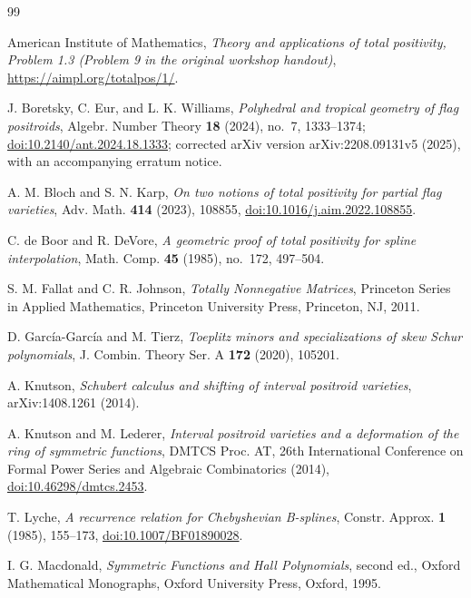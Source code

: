 \documentclass{amsart}
\numberwithin{equation}{section}
\theoremstyle{definition}
\theoremstyle{remark}
\begin{document}
\begin{thebibliography}{99}

American Institute of Mathematics,
\emph{Theory and applications of total positivity, Problem 1.3 (Problem 9 in the original workshop handout)},
\url{https://aimpl.org/totalpos/1/}.

J. Boretsky, C. Eur, and L. K. Williams,
\emph{Polyhedral and tropical geometry of flag positroids},
Algebr. Number Theory \textbf{18} (2024), no.~7, 1333--1374;
\href{https://doi.org/10.2140/ant.2024.18.1333}{doi:10.2140/ant.2024.18.1333};
corrected arXiv version arXiv:2208.09131v5 (2025), with an accompanying erratum notice.

A. M. Bloch and S. N. Karp,
\emph{On two notions of total positivity for partial flag varieties},
Adv. Math. \textbf{414} (2023), 108855,
\href{https://doi.org/10.1016/j.aim.2022.108855}{doi:10.1016/j.aim.2022.108855}.

C. de Boor and R. DeVore,
\emph{A geometric proof of total positivity for spline interpolation},
Math. Comp. \textbf{45} (1985), no.~172, 497--504.

S. M. Fallat and C. R. Johnson,
\emph{Totally Nonnegative Matrices},
Princeton Series in Applied Mathematics, Princeton University Press, Princeton, NJ, 2011.

D. Garc\'ia-Garc\'ia and M. Tierz,
\emph{Toeplitz minors and specializations of skew Schur polynomials},
J. Combin. Theory Ser. A \textbf{172} (2020), 105201.

A. Knutson,
\emph{Schubert calculus and shifting of interval positroid varieties},
arXiv:1408.1261 (2014).

A. Knutson and M. Lederer,
\emph{Interval positroid varieties and a deformation of the ring of symmetric functions},
DMTCS Proc. AT, 26th International Conference on Formal Power Series and Algebraic Combinatorics (2014),
\href{https://doi.org/10.46298/dmtcs.2453}{doi:10.46298/dmtcs.2453}.

T. Lyche,
\emph{A recurrence relation for Chebyshevian B-splines},
Constr. Approx. \textbf{1} (1985), 155--173,
\href{https://doi.org/10.1007/BF01890028}{doi:10.1007/BF01890028}.

I. G. Macdonald,
\emph{Symmetric Functions and Hall Polynomials}, second ed.,
Oxford Mathematical Monographs, Oxford University Press, Oxford, 1995.


\end{thebibliography}
\end{document}
